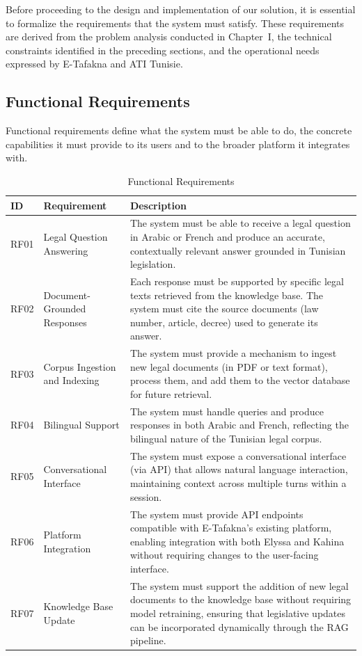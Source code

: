 Before proceeding to the design and implementation of our solution, it is
essential to formalize the requirements that the system must satisfy. These
requirements are derived from the problem analysis conducted in Chapter~I,
the technical constraints identified in the preceding sections, and the
operational needs expressed by E-Tafakna and \ac{ATI} Tunisie.

\subsection{Functional Requirements}

Functional requirements define what the system must be able to do, the
concrete capabilities it must provide to its users and to the broader
platform it integrates with.

\begin{table}[H]
\centering
\caption{Functional Requirements}
\label{tab:functional-requirements}
\renewcommand{\arraystretch}{1.5}
\begin{tabular}{|p{1cm}|p{4cm}|p{8.5cm}|}
\hline
\textbf{ID} & \textbf{Requirement} & \textbf{Description} \\
\hline
RF01 & Legal Question Answering &
The system must be able to receive a legal question in Arabic or French
and produce an accurate, contextually relevant answer grounded in Tunisian
legislation. \\
\hline
RF02 & Document-Grounded Responses &
Each response must be supported by specific legal texts retrieved from the
knowledge base. The system must cite the source documents (law number,
article, decree) used to generate its answer. \\
\hline
RF03 & Corpus Ingestion and Indexing &
The system must provide a mechanism to ingest new legal documents (in
\ac{PDF} or text format), process them, and add them to the vector
database for future retrieval. \\
\hline
RF04 & Bilingual Support &
The system must handle queries and produce responses in both Arabic and
French, reflecting the bilingual nature of the Tunisian legal corpus. \\
\hline
RF05 & Conversational Interface &
The system must expose a conversational interface (via \ac{API}) that
allows natural language interaction, maintaining context across multiple
turns within a session. \\
\hline
RF06 & Platform Integration &
The system must provide \ac{API} endpoints compatible with E-Tafakna's
existing platform, enabling integration with both Elyssa and Kahina
without requiring changes to the user-facing interface. \\
\hline
RF07 & Knowledge Base Update &
The system must support the addition of new legal documents to the
knowledge base without requiring model retraining, ensuring that
legislative updates can be incorporated dynamically through the
\ac{RAG} pipeline. \\
\hline
\end{tabular}
\end{table}

